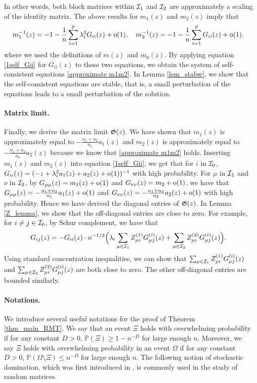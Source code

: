 In other words, both block matrices within $\cal I_1$ and $\cal I_2$ are approximately a scaling of the identity matrix.
The above results for $m_1(z)$ and $m_2(z)$ imply that
\begin{align*}
	m_1^{-1}(z) = -1- \frac{1}{n } \sum_{i=1}^p \lambda_i^2 G_{ii}(z)+ \oo(1),\quad  m_2^{-1}(z) = -1- \frac{1}{n } \sum_{i=1}^p G_{ii}(z)  + \oo(1).
\end{align*}
where we used the definitions of $m(z)$ and $m_0(z)$.
By applying equation \eqref{1self_Gii} for $G_{i i}(z)$ to these two equations, we obtain the system of self-consistent equations \eqref{approximate m1m2}.
In Lemma \ref{lem_stabw}, we show that the self-consistent equations are stable, that is, a small perturbation of the equations leads to a small perturbation of the solution.

\paragraph{Matrix limit.}
Finally, we derive the matrix limit $\Gi(z)$.
We have shown that $m_1(z)$ is approximately equal to $-\frac{n_1 + n_2}{n_1} a_1(z) $ and $m_2(z)$ is approximately equal to $-\frac{n_1 + n_2}{n_2} a_2(z)$ because we know that \eqref{approximate m1m2} holds.
Inserting $m_1(z)$ and $m_2(z)$ into equation \eqref{1self_Gii}, we get that for $i$ in $\cal I_0$,
$G_{ii}(z) = (-z +\lambda_i^2 a_{1}(z) + a_2(z)+\oo(1))^{-1}$ with high probability.
For $\mu$ in $\cal I_1$ and $\nu$ in $\cal I_2$, by $G_{\mu\mu}(z) = m_1(z) +\oo(1)$ and $G_{\nu\nu}(z) = m_2+\oo(1)$, we have that $G_{\mu \mu}(z) = -\frac{n_1 + n_2}{n_1}a_{1}(z)+\oo(1)$ and $G_{\nu\nu}(z) = -\frac{n_1 + n_2}{n_2}a_{2}(z)+\oo(1)$ with high probability.
Hence we have derived the diagonal entries of $\Gi(z)$.
In Lemma \ref{Z_lemma}, we show that the off-diagonal entries are close to zero.
For example, for $i\ne j\in \cal I_0$, by Schur complement, we have that
$$G_{ij}(z) = -G_{ii}(z)\cdot {n^{-1/2}}\Big({\lambda_i}\sum_{\mu \in \cal I_1} Z^{(1)}_{\mu i} G^{(i)}_{\mu j}(z) + \sum_{\mu \in \cal I_2} Z^{(2)}_{\mu i} G^{(i)}_{\mu j}(z) \Big).$$
Using standard concentration inequalities, we can show that $\sum_{\mu \in \cal I_1} Z^{(1)}_{\mu i} G^{(i)}_{\mu j}(z)$ and $\sum_{\mu \in \cal I_2} Z^{(2)}_{\mu i} G^{(i)}_{\mu j}(z)$ are both close to zero.
The other off-diagonal entries are bounded similarly.


\paragraph{Notations.}
We introduce several useful notations for the proof of Theorem \ref{thm_main_RMT}.
We say that an event $\Xi$ holds with overwhelming probability if for any constant $D>0$, $\mathbb P(\Xi)\ge 1- n^{-D}$ for large enough $n$.
Moreover, we say $\Xi$ holds with overwhelming probability in an event $\Omega$ if for any constant $D>0$, $\mathbb P(\Omega\setminus \Xi)\le n^{-D}$ for large enough $n$.
The following notion of stochastic domination, which was first introduced in \citet{Average_fluc}, is commonly used in the study of random matrices.

